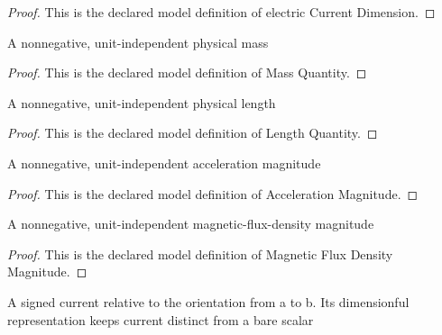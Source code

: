 \begin{proof}
  This is the declared model definition of electric Current Dimension.
\end{proof}
\begin{definition}
  \label{def:physics:phyx-mini-0951:phyxminiproblems-problemphyxmini0951-massquantity}
  A nonnegative, unit-independent physical mass
\end{definition}
\begin{proof}
  This is the declared model definition of Mass Quantity.
\end{proof}
\begin{definition}
  \label{def:physics:phyx-mini-0951:phyxminiproblems-problemphyxmini0951-lengthquantity}
  A nonnegative, unit-independent physical length
\end{definition}
\begin{proof}
  This is the declared model definition of Length Quantity.
\end{proof}
\begin{definition}
  \label{def:physics:phyx-mini-0951:phyxminiproblems-problemphyxmini0951-accelerationmagnitude}
  A nonnegative, unit-independent acceleration magnitude
\end{definition}
\begin{proof}
  This is the declared model definition of Acceleration Magnitude.
\end{proof}
\begin{definition}
  \label{def:physics:phyx-mini-0951:phyxminiproblems-problemphyxmini0951-magneticfluxdensitymagnitude}
  A nonnegative, unit-independent magnetic-flux-density magnitude
\end{definition}
\begin{proof}
  This is the declared model definition of Magnetic Flux Density Magnitude.
\end{proof}
\begin{definition}
  \label{def:physics:phyx-mini-0951:phyxminiproblems-problemphyxmini0951-electriccurrentquantity}
  A signed current relative to the orientation from a to b. Its dimensionful representation keeps current distinct from a bare scalar
\end{definition}
